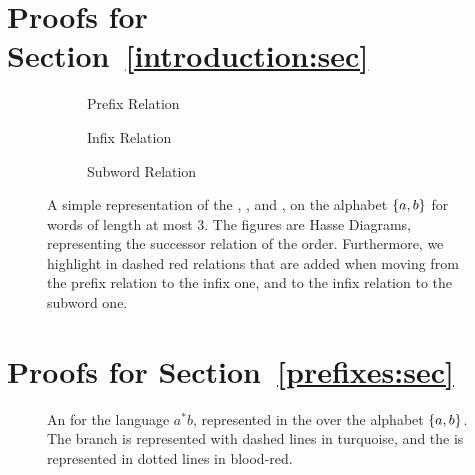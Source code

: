
\clearpage
\section{Proofs for Section~\ref{introduction:sec}}

\begin{figure}
    \centering
    \begin{subfigure}[t]{0.48\textwidth}
    	\centering
    	
    	\caption{Prefix Relation}
   	\end{subfigure}%
   	\hfill%
   	\begin{subfigure}[t]{0.48\textwidth}
   		\centering
   		
   		\caption{Infix Relation}
   	\end{subfigure}
   	\begin{subfigure}[t]{0.48\textwidth}
   		\centering
   		
   		\caption{Subword Relation}
   	\end{subfigure}
   	
   	\caption{A simple representation of the ,
        ,
        and ,
        on the alphabet $\{ a,b \}$ for words of
        length at most $3$. The figures are Hasse Diagrams,
        representing the successor relation of the order.
        Furthermore, we highlight in dashed red relations that are added
        when moving from the prefix relation to the infix one,
        and to the infix relation to the subword one.}
    \label{word-embeddings:fig}
\end{figure}


\clearpage
\section{Proofs for Section~\ref{prefixes:sec}}

\begin{figure}
    \centering
    
    \caption{An  for the language $a^* b$,
        represented in the  over the alphabet $\{ a,b \}$.
        The branch is represented with dashed lines in turquoise, and the
         is represented in dotted lines in blood-red.
    }
    \label{antichain-branch:fig}
\end{figure}



